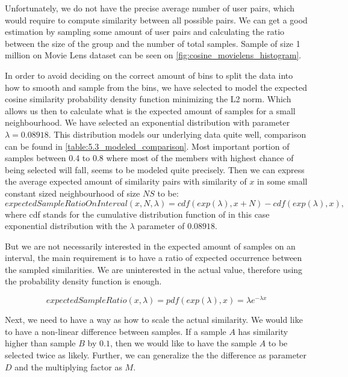 Unfortunately, we do not have the precise average number of user pairs, which would require to compute similarity between all possible pairs. We can get a good estimation by sampling some amount of user pairs and calculating the ratio between the size of the group and the number of total samples. Sample of size 1 million on Movie Lens dataset can be seen on \ref{fig:cosine_movielens_histogram}.


In order to avoid deciding on the correct amount of bins to split the data into how to smooth and sample from the bins, we have selected to model the expected cosine similarity probability density function minimizing the L2 norm. Which allows us then to calculate what is the expected amount of samples for a small neighbourhood. We have selected an exponential distribution with parameter $\lambda=0.08918$. This distribution models our underlying data quite well, comparison can be found in \ref{table:5.3_modeled_comparison}. Most important portion of samples between 0.4 to 0.8 where most of the members with highest chance of being selected will fall, seems to be modeled quite precisely.
Then we can express the average expected amount of similarity pairs with similarity of $x$ in some small constant sized neighbourhood of size $NS$ to be:
\begin{equation}
    expectedSampleRatioOnInterval(x, N, \lambda) = cdf(exp(\lambda), x + N) - cdf(exp(\lambda), x),
\end{equation}
where cdf stands for the cumulative distribution function of in this case exponential distribution with the $\lambda$ parameter of $0.08918$.

But we are not necessarily interested in the expected amount of samples on an interval, the main requirement is to have a ratio of expected occurrence between the sampled similarities. We are uninterested in the actual value, therefore using the probability density function is enough.

\begin{equation}
    expectedSampleRatio(x, \lambda) = pdf(exp(\lambda), x) = \lambda e ^{-\lambda x}
\end{equation}

Next, we need to have a way as how to scale the actual similarity. We would like to have a non-linear difference between samples. If a sample $A$ has similarity higher than sample $B$ by $0.1$, then we would like to have the sample $A$ to be selected twice as likely. Further, we can generalize the the difference as parameter $D$ and the multiplying factor as $M$.

